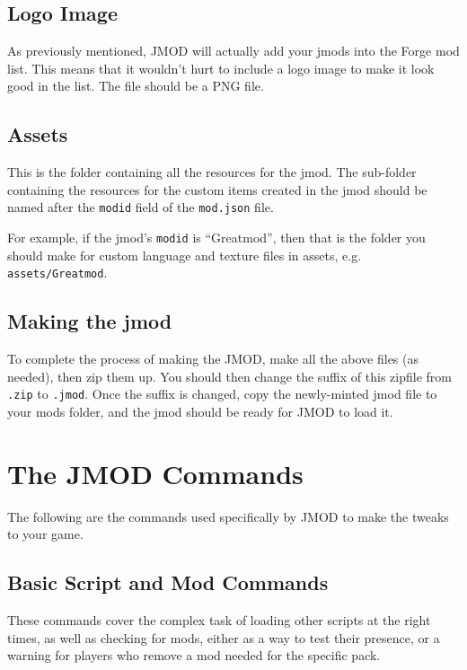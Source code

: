 \documentclass[letterpaper,titlepage,12pt]{article}
\begin{document}
\subsection{Logo Image}

As previously mentioned, JMOD will actually add your jmods into the Forge mod list.  This means that it wouldn't hurt to include a logo image to make it look good in the list.  The file should be a PNG file.

\subsection{Assets}

This is the folder containing all the resources for the jmod.  The sub-folder containing the resources for the custom items created in the jmod should be named after the \texttt{modid} field of the \texttt{mod.json} file.

For example, if the jmod's \texttt{modid} is ``Greatmod'', then that is the folder you should make for custom language and texture files in assets, e.g. \texttt{assets/Greatmod}.

\subsection{Making the jmod}

To complete the process of making the JMOD, make all the above files (as needed), then zip them up.  You should then change the suffix of this zipfile from \texttt{.zip} to \texttt{.jmod}.  Once the suffix is changed, copy the newly-minted jmod file to your mods folder, and the jmod should be ready for JMOD to load it.

\section{The JMOD Commands}

The following are the commands used specifically by JMOD to make the tweaks to your game.

\subsection{Basic Script and Mod Commands}

These commands cover the complex task of loading other scripts at the right times, as well as checking for mods, either as a way to test their presence, or a warning for players who remove a mod needed for the specific pack.
\end{document}
